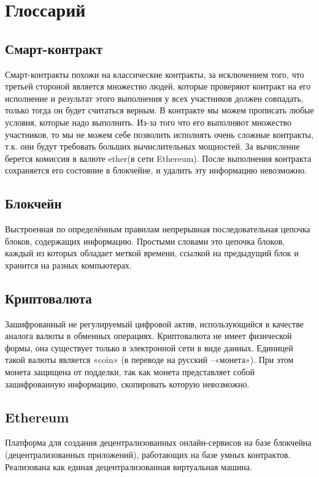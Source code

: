 \documentclass[a4paper,12pt]{report}
\begin{document}
\chapter{Глоссарий}

\section{Смарт-контракт}
Смарт-контракты похожи на классические контракты, за исключением того, что третьей стороной является множество людей, которые проверяют контракт на его исполнение и результат этого выполнения у всех участников должен совпадать, только тогда он будет считаться верным. В контракте мы можем прописать любые условия, которые надо выполнить. Из-за того что его выполняют множество участников, то мы не можем себе позволить исполнять очень сложные контракты, т.к. они будут требовать больших вычислительных мощностей. За вычисление берется комиссия в валюте ether(в сети Ethereum). После выполнения контракта сохраняется его состояние в блокчейне,
и удалить эту информацию невозможно.

\section{Блокчейн}
Выстроенная по определённым правилам непрерывная последовательная цепочка блоков, содержащих информацию. Простыми словами это цепочка блоков, каждый из которых обладает меткой времени, ссылкой на предыдущий блок и хранится на разных компьютерах.

\section{Криптовалюта}
Зашифрованный не регулируемый цифровой актив, использующийся в качестве аналога валюты в обменных операциях. Криптовалюта не имеет физической формы, она существует только в электронной сети в виде данных. Единицей такой валюты является «coin» (в переводе на русский –«монета»). При этом монета защищена от подделки, так как монета представляет собой зашифрованную информацию, скопировать которую невозможно.

\section{Ethereum}
Платформа для создания децентрализованных онлайн-сервисов на базе блокчейна (децентрализованных приложений), работающих на базе умных контрактов. Реализована как единая децентрализованная виртуальная машина.
\end{document}
